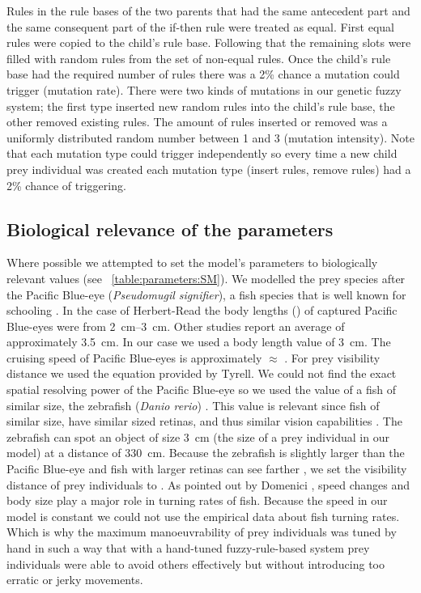 Rules in the rule bases of the two parents that had the same antecedent part and the same consequent part of the if-then rule were treated as equal. First equal rules were copied to the child's rule base. Following that the remaining slots were filled with random rules from the set of non-equal rules. Once the child's rule base had the required number of rules there was a 2\% chance a mutation could trigger (mutation rate). There were two kinds of mutations in our genetic fuzzy system; the first type inserted new random rules into the child's rule base, the other removed existing rules. The amount of rules inserted or removed was a uniformly distributed random number between 1 and 3 (mutation intensity). Note that each mutation type could trigger independently so every time a new child prey individual was created each mutation type (insert rules, remove rules) had a 2\% chance of triggering.

\subsection{Biological relevance of the parameters}

Where possible we attempted to set the model's parameters to biologically relevant values (see \tablename~\ref{table:parameters:SM}). We modelled the prey species after the Pacific Blue-eye (\emph{Pseudomugil signifier}), a fish species that is well known for schooling \cite{herbertread2010sensory,herbertread2015intiation,herbertread2016threedimensional}. In the case of Herbert-Read\etal \cite{herbertread2015intiation} the body lengths (\si{\bodylength}) of captured Pacific Blue-eyes were from \SIrange{2}{3}{\cm}. Other studies \cite{pusey2004freshwater} report an average \si{\bodylength} of approximately \SI{3.5}{\cm}. In our case we used a body length value of \SI{3}{\cm}. The cruising speed of Pacific Blue-eyes is approximately  $\approx$  \cite{herbertread2015intiation}. For prey visibility distance we used the equation provided by Tyrell\etal \cite{tyrrell2013looking}. We could not find the exact spatial resolving power of the Pacific Blue-eye so we used the value of a fish of similar size, the zebrafish (\emph{Danio rerio}) \cite{pita2015vision}. This value is relevant since fish of similar size, have similar sized retinas, and thus similar vision capabilities \cite{hairston1982fish}. The zebrafish can spot an object of size \SI{3}{\cm} (the size of a prey individual in our model) at a distance of \SI{330}{\cm}. Because the zebrafish is slightly larger than the Pacific Blue-eye and fish with larger retinas can see farther \cite{hairston1982fish}, we set the visibility distance of prey individuals to . As pointed out by Domenici \cite{domenici2001scaling}, speed changes and body size play a major role in turning rates of fish. Because the speed in our model is constant we could not use the empirical data about fish turning rates. Which is why the maximum manoeuvrability of prey individuals was tuned by hand in such a way that with a hand-tuned fuzzy-rule-based system prey individuals were able to avoid others effectively but without introducing too erratic or jerky movements.

